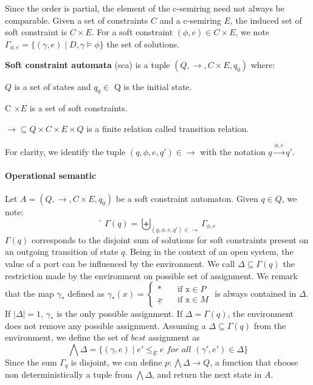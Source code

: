 Since the order is partial, the element of the c-semiring need not always be comparable. 
Given a set of constraints $C$ and a c-semiring $E$, the induced set of soft constraint is $C\times E$. For a soft constraint $(\phi,e) \in C \times E$, we note $\Gamma_{\phi,e} = \{ (\gamma,e) \mid D,\gamma \models \phi \}$ the set of solutions.

\begin{definition}
	\textbf{Soft constraint automata} (sca) is a tuple $(Q, \rightarrow, C \times E, q_{0} )$ where: 
	\begin{list}{-}{ }
		\item $Q$ is a set of states and $q_0\in$ Q is the initial state.
		\item C $\times E$ is a set of soft constraints.
		\item $\rightarrow \subseteq Q \times C \times E \times Q$ is a finite relation called transition relation. 
	\end{list}
\end{definition}
For clarity, we identify the tuple $(q,\phi,e,q') \in \rightarrow$ with the notation $q \xrightarrow{\phi,e} q'$.
\paragraph{Operational semantic}
Let $A = (Q, \rightarrow, C \times E, q_{0} )$ be a soft constraint automaton. Given $q\in Q$, we note:
 $$̀\Gamma(q) = \biguplus_{(q,\phi,e,q') \in \rightarrow}\Gamma_{\phi,e} $$
$\Gamma(q)$ corresponds to the disjoint sum of solutions for soft constraints present on an outgoing transition of state $q$. Being in the context of an open system, the value of a port can be influenced by the environment. We call $\Delta \subseteq \Gamma(q) $ the restriction made by the environment on possible set of assignment. We remark that the map $\gamma_*$ defined as $ \gamma_*(x) = 
\begin{cases}
	* &\quad\text{if x}\in P \\ 
	\underline{x} &\quad\text{if x} \in M  
\end{cases}$
 is always contained in $\Delta$. If $|\Delta|=1$, $\gamma_*$ is the only possible assignment. If $\Delta = \Gamma(q)$, the environment does not remove any possible assignment. Assuming a $\Delta \subseteq \Gamma(q)$ from the environment, we define the set of $best$ assignment as $$\bigwedge\Delta= \{(\gamma, e) \mid e' \leq_E e \textit{ for all } (\gamma',e')\in \Delta \}$$ Since the sum $\Gamma_q$ is disjoint, we can define $p : \bigwedge\Delta \rightarrow Q$, a function that choose non deterministically a tuple from $\bigwedge\Delta$, and return the next state in $A$.

